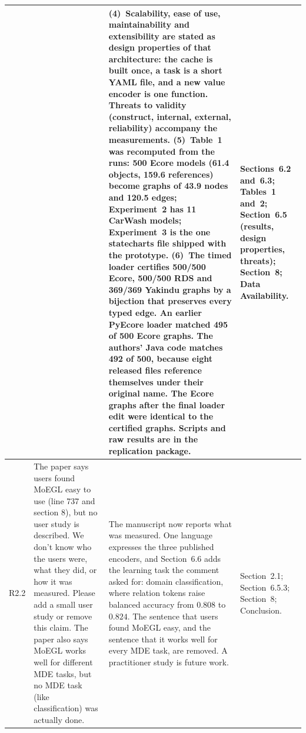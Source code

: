 \documentclass[11pt,a4paper]{article}
\begin{document}
\begin{longtable}{@{}P{1.0cm}P{4.3cm}P{5.9cm}P{3.9cm}@{}}
 & &
(4)~Scalability, ease of use, maintainability and extensibility are stated as design properties of that architecture: the cache is built once, a task is a short YAML file, and a new value encoder is one function. Threats to validity (construct, internal, external, reliability) accompany the measurements.
(5)~Table~1 was recomputed from the runs: 500 Ecore models (61.4 objects, 159.6 references) become graphs of 43.9 nodes and 120.5 edges; Experiment~2 has 11 CarWash models; Experiment~3 is the one statecharts file shipped with the prototype.
(6)~The timed loader certifies 500/500 Ecore, 500/500 RDS and 369/369 Yakindu graphs by a bijection that preserves every typed edge. An earlier PyEcore loader matched 495 of 500 Ecore graphs. The authors' Java code matches 492 of 500, because eight released files reference themselves under their original name. The Ecore graphs after the final loader edit were identical to the certified graphs.
Scripts and raw results are in the replication package. &
Sections~6.2 and~6.3; Tables~1 and~2; Section~6.5 (results, design properties, threats); Section~8; Data Availability. \\
\midrule

R2.2 &
The paper says users found MoEGL easy to use (line 737 and section 8), but no user study is described. We don't know who the users were, what they did, or how it was measured. Please add a small user study or remove this claim. The paper also says MoEGL works well for different MDE tasks, but no MDE task (like classification) was actually done. &
The manuscript now reports what was measured. One language expresses the three published encoders, and Section~6.6 adds the learning task the comment asked for: domain classification, where relation tokens raise balanced accuracy from $0.808$ to $0.824$. The sentence that users found MoEGL easy, and the sentence that it works well for every MDE task, are removed. A practitioner study is future work. &
Section~2.1; Section~6.5.3; Section~8; Conclusion. \\
\midrule


\end{longtable}
\end{document}
